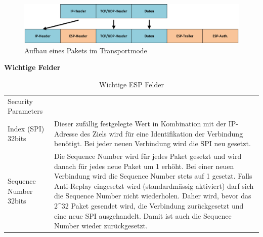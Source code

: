 \begin{figure}[H]
    \begin{center}
        \includegraphics[trim=1 0 0 0,clip,width=\textwidth]{mainpart/analyse/img/ESP_Transportmode.png}
    \end{center}
    \caption{Aufbau eines Pakets im Transportmode}
\end{figure}


\textbf{Wichtige Felder}

\begin{table}[H]
\begin{tabularx}{\textwidth}{l|>{\raggedright\arraybackslash}X} 
\hline
Security Parameters\\ Index (SPI) 32bits & Dieser zufällig festgelegte Wert in Kombination mit der IP-Adresse des Ziels wird für eine Identifikation der Verbindung benötigt. Bei jeder neuen Verbindung wird die SPI neu gesetzt.                                                                                                                                                                                                                                                                         \\ \hline
Sequence Number 32bits & Die Sequence Number wird für jedes Paket gesetzt und wird danach für jedes neue Paket um 1 erhöht. Bei einer neuen Verbindung wird die Sequence Number stets auf 1 gesetzt. Falls Anti-Replay eingesetzt wird (standardmässig aktiviert) darf sich die Sequence Number nicht wiederholen. Daher wird, bevor das 2\^{}32 Paket gesendet wird, die Verbindung zurückgesetzt und eine neue SPI ausgehandelt. Damit ist auch die Sequence Number wieder zurückgesetzt. \\
\hline
\end{tabularx}
\caption{Wichtige ESP Felder}
\end{table}